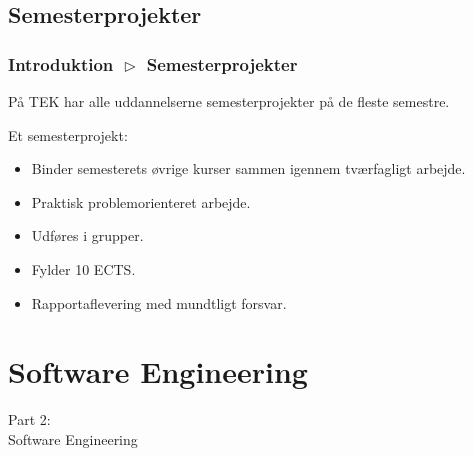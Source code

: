 \subsection{Semesterprojekter}
\begin{frame}[fragile]
  \frametitle{Introduktion $\vartriangleright$ Semesterprojekter}
  \vspace{5mm}
  På TEK har alle uddannelserne semesterprojekter på de fleste semestre.
  
  \pause
  \vspace{7mm}
  Et semesterprojekt:
  \begin{itemize}
    \item Binder semesterets øvrige kurser sammen igennem tværfagligt arbejde.
    \item Praktisk problemorienteret arbejde.
    \item Udføres i grupper.
    \item Fylder 10 ECTS.
    \item Rapportaflevering med mundtligt forsvar.
  \end{itemize}
\end{frame}

\section{Software Engineering}
\begin{frame}
    \vspace{25mm}
    \begin{center}
        \Huge{Part 2:\\Software Engineering}
    \end{center}
\end{frame}

